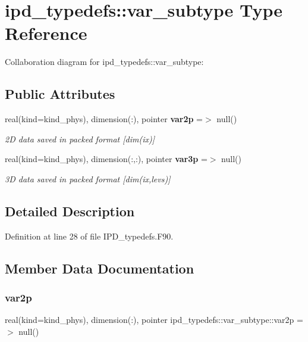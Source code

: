 \section{ipd\+\_\+typedefs\+:\+:var\+\_\+subtype Type Reference}
\label{structipd__typedefs_1_1var__subtype}


Collaboration diagram for ipd\+\_\+typedefs\+:\+:var\+\_\+subtype\+:
\subsection*{Public Attributes}
\begin{DoxyCompactItemize}
\item 
real(kind=kind\+\_\+phys), dimension(\+:), pointer \textbf{ var2p} =$>$ null()
\begin{DoxyCompactList}\small\item\em 2D data saved in packed format [dim(ix)] \end{DoxyCompactList}\item 
real(kind=kind\+\_\+phys), dimension(\+:,\+:), pointer \textbf{ var3p} =$>$ null()
\begin{DoxyCompactList}\small\item\em 3D data saved in packed format [dim(ix,levs)] \end{DoxyCompactList}\end{DoxyCompactItemize}


\subsection{Detailed Description}


Definition at line 28 of file I\+P\+D\+\_\+typedefs.\+F90.



\subsection{Member Data Documentation}
\mbox{\label{structipd__typedefs_1_1var__subtype_a8132a7878148406087b974fbedb2e18c}} 
\subsubsection{var2p}
{\footnotesize\ttfamily real(kind=kind\+\_\+phys), dimension(\+:), pointer ipd\+\_\+typedefs\+::var\+\_\+subtype\+::var2p =$>$ null()}



